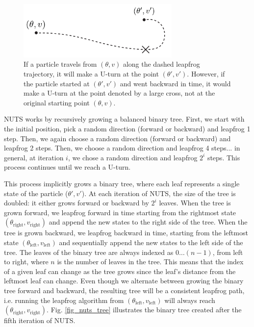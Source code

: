 \documentclass[12pt]{article}
\begin{document}
\begin{figure}[H]
\centering
\includegraphics[width=8cm]{illustrations/nuts_uturn_detailed_balance.pdf}
\caption{If a particle travels from $(\theta, v)$ along the dashed leapfrog trajectory, it will make a U-turn at the point $(\theta', v')$. However, if the particle started at $(\theta', v')$ and went backward in time, it would make a U-turn at the point denoted by a large cross, not at the original starting point $(\theta, v)$.}
\label{fig_nuts_uturn_detailed_balance}
\end{figure}

NUTS works by recursively growing a balanced binary tree. First, we start with the initial position, pick a random direction (forward or backward) and leapfrog 1 step. Then, we again choose a random direction (forward or backward) and leapfrog 2 steps. Then, we choose a random direction and leapfrog 4 steps... in general, at iteration $i$, we chose a random direction and leapfrog $2^i$ steps. This process continues until we reach a U-turn.

This process implicitly grows a binary tree, where each leaf represents a single state of the particle ($\theta', v'$). At each iteration of NUTS, the size of the tree is doubled: it either grows forward or backward by $2^i$ leaves. When the tree is grown forward, we leapfrog forward in time starting from the rightmost state $(\theta_\text{right}, v_\text{right})$ and append the new states to the right side of the tree. When the tree is grown backward, we leapfrog backward in time, starting from the leftmost state $(\theta_\text{left}, v_\text{left})$ and sequentially append the new states to the left side of the tree. The leaves of the binary tree are always indexed as $0 \ldots (n-1)$, from left to right, where $n$ is the number of leaves in the tree. This means that the index of a given leaf can change as the tree grows since the leaf's distance from the leftmost leaf can change. Even though we alternate between growing the binary tree forward and backward, the resulting tree will be a consistent leapfrog path, i.e. running the leapfrog algorithm from $(\theta_\text{left}, v_\text{left})$ will always reach $(\theta_\text{right}, v_\text{right})$. Fig. \ref{fig_nuts_tree} illustrates the binary tree created after the fifth iteration of NUTS.
\end{document}

